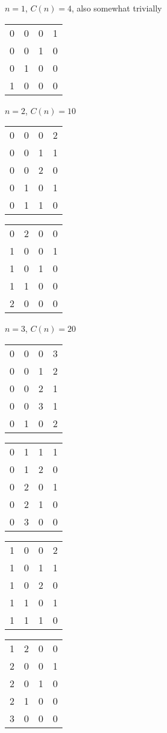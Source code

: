 \documentclass{article}
\begin{document}
$n=1$, $C(n)=4$, also somewhat trivially
\begin{center}
\begin{tabular}{c c c c}
0 & 0 & 0 & 1 \\
0 & 0 & 1 & 0 \\
0 & 1 & 0 & 0 \\
1 & 0 & 0 & 0
\end{tabular}
\end{center}

\vspace{0.2in}

$n=2$, $C(n)=10$
\begin{center}
\begin{tabular}{c c c c}
0 & 0 & 0 & 2 \\
0 & 0 & 1 & 1 \\
0 & 0 & 2 & 0 \\
0 & 1 & 0 & 1 \\
0 & 1 & 1 & 0
\end{tabular}
\qquad
\begin{tabular}{c c c c}
0 & 2 & 0 & 0 \\
1 & 0 & 0 & 1 \\
1 & 0 & 1 & 0 \\
1 & 1 & 0 & 0 \\
2 & 0 & 0 & 0
\end{tabular}
\end{center}

\vspace{0.2in}

$n=3$, $C(n)=20$
\begin{center}
\begin{tabular}{c c c c}
0 & 0 & 0 & 3 \\
0 & 0 & 1 & 2 \\
0 & 0 & 2 & 1 \\
0 & 0 & 3 & 1 \\
0 & 1 & 0 & 2
\end{tabular}
\qquad
\begin{tabular}{c c c c}
0 & 1 & 1 & 1 \\
0 & 1 & 2 & 0 \\
0 & 2 & 0 & 1 \\
0 & 2 & 1 & 0 \\
0 & 3 & 0 & 0
\end{tabular}
\qquad
\begin{tabular}{c c c c}
1 & 0 & 0 & 2 \\
1 & 0 & 1 & 1 \\
1 & 0 & 2 & 0 \\
1 & 1 & 0 & 1 \\
1 & 1 & 1 & 0
\end{tabular}
\qquad
\begin{tabular}{c c c c}
1 & 2 & 0 & 0 \\
2 & 0 & 0 & 1 \\
2 & 0 & 1 & 0 \\
2 & 1 & 0 & 0 \\
3 & 0 & 0 & 0
\end{tabular}
\end{center}
\end{document}
